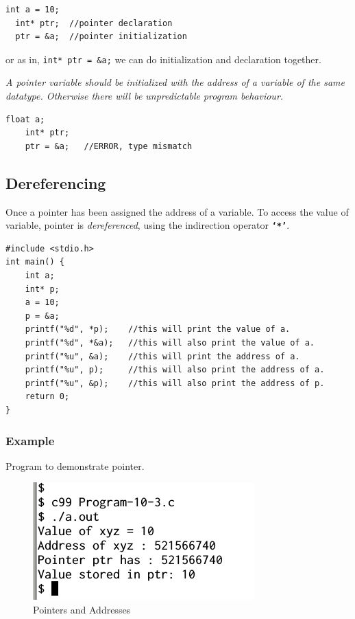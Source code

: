 \documentclass[11pt,a4paper]{article}
\begin{document}
\begin{lstlisting}[numbers=none]
  int a = 10;
  int* ptr;  //pointer declaration
  ptr = &a;  //pointer initialization
\end{lstlisting}

    or as in, \lstinline!int* ptr = &a;! we can do initialization and declaration together.

\emph{A pointer variable should be initialized with the address of a variable of the same datatype. Otherwise there will be unpredictable program behaviour.}

\begin{lstlisting}[numbers=none]
    float a;
    int* ptr;
    ptr = &a;   //ERROR, type mismatch
\end{lstlisting}

\subsection*{Dereferencing}
Once a pointer has been assigned the address of a variable. To access the value of variable, pointer is \emph{dereferenced}, using the indirection operator \textbf{\texttt{`*'}}.

\begin{lstlisting}
#include <stdio.h>
int main() {
    int a;
    int* p;
    a = 10;
    p = &a;   
    printf("%d", *p);    //this will print the value of a. 
    printf("%d", *&a);   //this will also print the value of a.
    printf("%u", &a);    //this will print the address of a.
    printf("%u", p);     //this will also print the address of a.
    printf("%u", &p);    //this will also print the address of p.
    return 0;
}
\end{lstlisting}

\subsubsection*{Example}
Program to demonstrate pointer.



\begin{figure}[ht]
\begin{center}
\includegraphics[scale=0.6]{Output-10-3.png}
\caption{Pointers and Addresses}
\label{output-10-3}
\end{center}
\end{figure}
\end{document}
